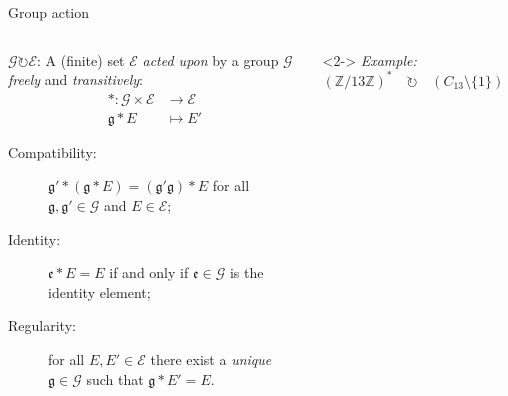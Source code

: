 \documentclass[aspectratio=169]{beamer}
\newcommand{\g}{\mathfrak{g}}
\newcommand{\G}{\mathcal{G}}
\newcommand{\E}{\mathcal{E}}
\begin{document}
\begin{frame}{Group action}
  \begin{columns}
    \begin{column}{0.5\textwidth}
      \emph{$\G\circlearrowright\E$}: A (finite) set $\E$ \emph{acted
        upon} by a group $\G$ \emph{freely} and \emph{transitively}:
      \begin{align*}
        * : \G × \E &→ \E\\
        \g * E &↦ E'
      \end{align*}
      \par\begin{description}
      \item[Compatibility:] \emph{$\g' * (\g * E) = (\g'\g)*E$} for all
        $\g,\g'\in\G$ and $E\in\E$;
      \item[Identity:] \emph{$\mathfrak{e} * E = E$} if and only if
        $\mathfrak{e}\in\G$ is the identity element;
      \item[Regularity:] for all $E,E'\in\E$ there exist a \emph{unique
          $\g\in\G$} such that \emph{$\g*E'=E$}.
        \setlength{\itemsep}{2em}
      \end{description}
    \end{column}
    \begin{column}{0.45\textwidth}
      \centering
      \begin{uncoverenv}<2->
        \emph{Example:} $(ℤ/13ℤ)^\ast \quad\circlearrowright\quad (C_{13} \setminus \{1\})$

        \bigskip
      \end{uncoverenv}
    \end{column}
  \end{columns}
\end{frame}
\end{document}
